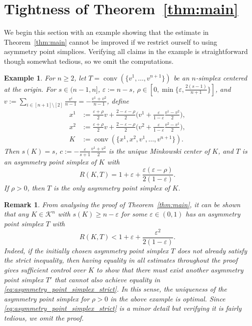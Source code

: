 \documentclass{amsart}
\newtheorem{remark}[theorem]{Remark}
\newtheorem{example}[theorem]{Example}
\newcommand\CK{\mathcal{K}}
\DeclareMathOperator{\conv}{conv}
\begin{document}
\section{Tightness of Theorem\texorpdfstring{~\ref{thm:main}}{ 1.1}}\label{sec:tightness}





We begin this section with an example showing that the estimate in Theorem~\ref{thm:main} cannot be improved if we restrict ourself
to using asymmetry point simplices.
Verifying all claims in the example is straightforward though somewhat tedious, so we omit the computations.

\begin{example}\label{ex:asymmetry_simplex_tightness}
For $n \geq 2$, let $T = \conv(\{ v^1, \dots, v^{n+1} \})$ be an $n$-simplex centered at the origin.
For $s \in (n-1,n]$,
$\varepsilon := n - s$,
$\rho \in [0,\min\{ \varepsilon, \frac{2 (s-1)}{n+1} \}]$,
and $v := \sum_{i \in [n+1] \setminus [2]} \frac{v^i}{n-1} = - \frac{v^1 + v^2}{n-1}$,
define
\begin{align*}
	x^1 & := \frac{\varepsilon + \rho}{2} v + \frac{2 - \varepsilon - \rho}{2} \bigg( v^1 + \frac{\varepsilon}{1 - \varepsilon} \frac{v^1 - v^2}{2} \bigg),
    \\
	x^2 & := \frac{\varepsilon + \rho}{2} v + \frac{2 - \varepsilon - \rho}{2} \bigg( v^2 + \frac{\varepsilon}{1 - \varepsilon} \frac{v^2 - v^1}{2} \bigg),
    \\
    K & := \conv(\{ x^1, x^2, v^1, \dots, v^{n+1} \}).
\end{align*}
Then $s(K) = s$, $c := - \frac{\varepsilon}{s+1} \frac{v^1 + v^2}{2}$ is the unique Minkowski center of $K$, and $T$ is an asymmetry point simplex of $K$ with
\[
	R(K,T)
    = 1 + \varepsilon + \frac{\varepsilon (\varepsilon - \rho)}{2 (1 - \varepsilon)}.
\]
If $\rho > 0$, then $T$ is the only asymmetry point simplex of $K$.
\end{example}



\begin{remark}
From analysing the proof of Theorem~\ref{thm:main}, it can be shown that any $K \in \CK^n$ with $s(K) \geq n - \varepsilon$ for some $\varepsilon \in (0,1)$ has an asymmetry point simplex $T$ with
\begin{equation}\label{eq:asymmetry_point_simplex_strict}
    R(K,T)
    < 1 + \varepsilon + \frac{\varepsilon^2}{2 (1-\varepsilon)}.
\end{equation}
Indeed, if the initially chosen asymmetry point simplex $T$ does not already satisfy the strict inequality, then having equality in all estimates throughout the proof gives sufficient control over $K$ to show that there must exist another asymmetry point simplex $T'$ that cannot also achieve equality in \eqref{eq:asymmetry_point_simplex_strict}.
In this sense, the uniqueness of the asymmetry point simplex for $\rho > 0$ in the above example is optimal.
Since \eqref{eq:asymmetry_point_simplex_strict} is a minor detail but verifying it is fairly tedious, we omit the proof.
\end{remark}
\end{document}
